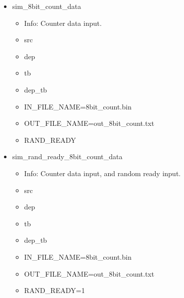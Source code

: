 \begin{itemize}
\begin{itemize}
	\end{itemize}
\item sim\_8bit\_count\_data
	\begin{itemize}
	\item[$\space$] Info: Counter data input.
	\item src
	\item dep
	\item tb
	\item dep\_tb
	\item IN\_FILE\_NAME=8bit\_count.bin
	\item OUT\_FILE\_NAME=out\_8bit\_count.txt
	\item RAND\_READY
	\end{itemize}
\item sim\_rand\_ready\_8bit\_count\_data
	\begin{itemize}
	\item[$\space$] Info: Counter data input, and random ready input.
	\item src
	\item dep
	\item tb
	\item dep\_tb
	\item IN\_FILE\_NAME=8bit\_count.bin
	\item OUT\_FILE\_NAME=out\_8bit\_count.txt
	\item RAND\_READY=1
	\end{itemize}
\end{itemize}
